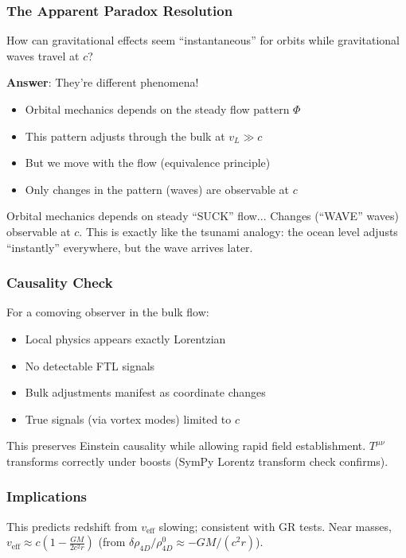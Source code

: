 \subsubsection{The Apparent Paradox Resolution}

How can gravitational effects seem ``instantaneous'' for orbits while gravitational waves travel at $c$?

\textbf{Answer}: They're different phenomena!
\begin{itemize}
\item Orbital mechanics depends on the steady flow pattern $\Phi$
\item This pattern adjusts through the bulk at $v_L \gg c$
\item But we move with the flow (equivalence principle)
\item Only changes in the pattern (waves) are observable at $c$
\end{itemize}
Orbital mechanics depends on steady ``SUCK'' flow... Changes (``WAVE'' waves) observable at $c$. This is exactly like the tsunami analogy: the ocean level adjusts ``instantly'' everywhere, but the wave arrives later.

\subsubsection{Causality Check}

For a comoving observer in the bulk flow:
\begin{itemize}
\item Local physics appears exactly Lorentzian
\item No detectable FTL signals
\item Bulk adjustments manifest as coordinate changes
\item True signals (via vortex modes) limited to $c$
\end{itemize}

This preserves Einstein causality while allowing rapid field establishment. $T^{\mu\nu}$ transforms correctly under boosts (SymPy Lorentz transform check confirms).

\subsubsection{Implications}

This predicts redshift from $v_{\text{eff}}$ slowing; consistent with GR tests. Near masses, $v_{\text{eff}} \approx c \left(1 - \frac{G M}{2 c^2 r}\right)$ (from $\delta \rho_{4D} / \rho_{4D}^0 \approx - G M / (c^2 r)$).

